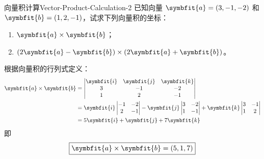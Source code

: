 \begin{problem}{向量积计算}{Vector-Product-Calculation-2}
    已知向量 $\symbfit{a} = (3, -1, -2)$ 和 $\symbfit{b} = (1, 2, -1)$，试求下列向量积的坐标：
    \begin{enumerate}
        \item $\symbfit{a} \times \symbfit{b}$；
        \item $(2\symbfit{a} - \symbfit{b}) \times (2\symbfit{a} + \symbfit{b})$。
    \end{enumerate}
\end{problem}

\begin{solution}

    根据向量积的行列式定义：
    \begin{equation*}
        \begin{aligned}
            \symbfit{a} \times \symbfit{b} & = \begin{vmatrix} \symbfit{i} & \symbfit{j} & \symbfit{k} \\ 3 & -1 & -2 \\ 1 & 2 & -1 \end{vmatrix}                                                                                   \\
                                           & = \symbfit{i} \begin{vmatrix} -1 & -2 \\ 2 & -1 \end{vmatrix} - \symbfit{j} \begin{vmatrix} 3 & -2 \\ 1 & -1 \end{vmatrix} + \symbfit{k} \begin{vmatrix} 3 & -1 \\ 1 & 2 \end{vmatrix} \\
                                           & = 5\symbfit{i} + \symbfit{j} + 7\symbfit{k}
        \end{aligned}
    \end{equation*}
    即
    \begin{equation*}
        \boxed{\symbfit{a} \times \symbfit{b} = (5, 1, 7)}
    \end{equation*}



\end{solution}
